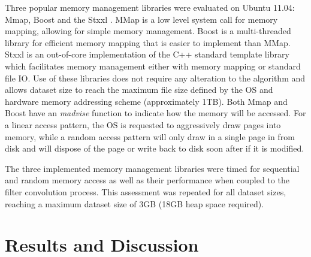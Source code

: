 Three popular memory management libraries were evaluated on Ubuntu 11.04: Mmap, Boost \citep{Gaz2012} and the Stxxl \citep{Dementiev2005}.
MMap is a low level system call for memory mapping, allowing for simple memory management.
Boost is a multi-threaded library for efficient memory mapping that is easier to implement than MMap.
 Stxxl is an out-of-core implementation of the C++ standard template library which facilitates memory management either with memory mapping or standard file IO.
Use of these libraries does not require any alteration to the algorithm  and allows dataset size to reach
the maximum file size defined by the OS and hardware memory addressing scheme (approximately 1TB).
Both Mmap and Boost have an \emph{madvise}  function to indicate how the memory will be accessed.
For a linear access pattern, the OS is requested to aggressively draw pages into memory, while  a random access pattern will only draw in a single page in from disk and will dispose of the page or write back to disk soon after if it is modified.

The three implemented memory management libraries were timed for sequential and random memory access as well as their performance when coupled to the filter convolution process.  This assessment  was repeated for all dataset sizes, reaching a maximum dataset size of 3GB (18GB heap space required). 


\section{Results and Discussion}
  
